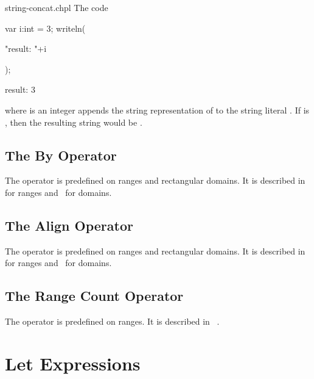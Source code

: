 \begin{chapelexample}{string-concat.chpl}
The code
\begin{chapelnoprint}
var i:int = 3;
writeln(
\end{chapelnoprint}
\begin{chapel}
"result: "+i
\end{chapel}
\begin{chapelnoprint}
);
\end{chapelnoprint}
\begin{chapeloutput}
result: 3
\end{chapeloutput}
where  is an integer appends the string representation of  to the
string literal .  If  is , then the resulting string
would be .
\begin{chapelnoprint}
\end{chapelnoprint}
\end{chapelexample}

\subsection{The By Operator}
\label{The_By_Operator}

The operator  is predefined on ranges and rectangular domains.
It is described in~ for ranges
and~ for domains.

\subsection{The Align Operator}
\label{The_Align_Operator}

The operator  is predefined on ranges and rectangular domains.
It is described in~ for ranges
and~ for domains.

\subsection{The Range Count Operator}
\label{The_Range_Count_Operator}

The operator \chpl{#} is predefined on ranges. It is described
in ~.

\section{Let Expressions}
\label{Let_Expressions}

